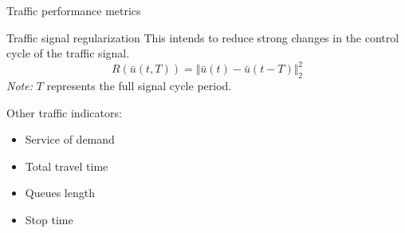 
\begin{frame}{Traffic performance metrics}
    \begin{exampleblock}{Traffic signal regularization}
    This intends to reduce strong changes in the control cycle of the traffic signal. 
    \[
    R(\bar{u}(t,T))= \Vert\bar{u}(t)-\bar{u}(t-T)\Vert_2^2
    \]
    \emph{Note:} $T$ represents the full signal cycle period.
    \end{exampleblock}  
    \begin{exampleblock}{Other traffic indicators:}
        \begin{itemize}
        \item Service of demand
        \item Total travel time
        \item Queues length
        \item Stop time
        \end{itemize}
    \end{exampleblock}
\end{frame}